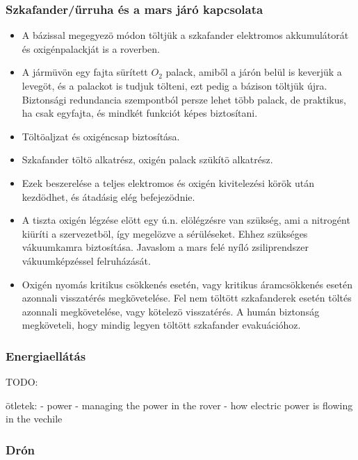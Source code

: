 \documentclass[12pt]{report}
\begin{document}
\subsubsection{Szkafander/űrruha és a mars járó kapcsolata}
\begin{itemize}

  \item {} A bázissal megegyezö módon töltjük a szkafander elektromos akkumulátorát és oxigénpalackját is a roverben.
  \item {} A jármüvön egy fajta sürített \(O_2\) palack, amiből a járón belül is keverjük a levegöt, és a palackot is tudjuk tölteni, ezt pedig a bázison töltjük újra. Biztonsági redundancia szempontból persze lehet több palack, de praktikus, ha csak egyfajta, és mindkét funkciót képes biztosítani.
  \item {} Töltöaljzat és oxigéncsap biztosítása.
  \item {} Szkafander töltö alkatrész, oxigén palack szükítö alkatrész.
  \item Ezek beszerelése a teljes elektromos és oxigén kivitelezési körök után kezdödhet, és átadásig elég befejezödnie.
  \item {} A tiszta oxigén légzése elött egy ú.n. elölégzésre van szükség, ami a nitrogént kiüríti a szervezetböl, így megelözve a sérüléseket. Ehhez szükséges vákuumkamra biztosítása. Javaslom a mars felé nyíló zsiliprendszer vákuumképzéssel felruházását.
  \item {} Oxigén nyomás kritikus csökkenés esetén, vagy kritikus áramcsökkenés esetén azonnali visszatérés megkövetelése. Fel nem töltött szkafanderek esetén töltés azonnali megkövetelése, vagy kötelezö visszatérés. A humán biztonság megköveteli, hogy mindig legyen töltött szkafander evakuációhoz.
\end{itemize}

\subsubsection{Energiaellátás}

TODO:

ötletek:
- power
  - managing the power in the rover
  - how electric power is flowing in the vechile

\subsubsection{Drón}
\end{document}
